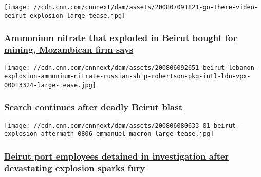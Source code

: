 \href{/2020/08/07/middleeast/beirut-lebanon-ammonium-nitrate-explosion/index.html}{}

\texttt{[image: //cdn.cnn.com/cnnnext/dam/assets/200807091821-go-there-video-beirut-explosion-large-tease.jpg]}

\hypertarget{ammonium-nitrate-that-exploded-in-beirut-bought-for-mining-mozambican-firm-says-}{%
\subsubsection{\texorpdfstring{\href{/2020/08/07/middleeast/beirut-lebanon-ammonium-nitrate-explosion/index.html}{Ammonium
nitrate that exploded in Beirut bought for mining, Mozambican firm says
}}{Ammonium nitrate that exploded in Beirut bought for mining, Mozambican firm says }}\label{ammonium-nitrate-that-exploded-in-beirut-bought-for-mining-mozambican-firm-says-}}

\href{/middleeast/live-news/beirut-lebanon-explosion-08-06-2020/index.html}{}

\texttt{[image: //cdn.cnn.com/cnnnext/dam/assets/200806092651-beirut-lebanon-explosion-ammonium-nitrate-russian-ship-robertson-pkg-intl-ldn-vpx-00013324-large-tease.jpg]}

\hypertarget{search-continues-after-deadly-beirut-blast}{%
\subsubsection{\texorpdfstring{\href{/middleeast/live-news/beirut-lebanon-explosion-08-06-2020/index.html}{Search
continues after deadly Beirut
blast}}{Search continues after deadly Beirut blast}}\label{search-continues-after-deadly-beirut-blast}}

\href{/2020/08/06/middleeast/beirut-explosion-anger-intl-hnk/index.html}{}

\texttt{[image: //cdn.cnn.com/cnnnext/dam/assets/200806080633-01-beirut-explosion-aftermath-0806-emmanuel-macron-large-tease.jpg]}

\hypertarget{beirut-port-employees-detained-in-investigation-after-devastating-explosion-sparks-fury}{%
\subsubsection{\texorpdfstring{\href{/2020/08/06/middleeast/beirut-explosion-anger-intl-hnk/index.html}{Beirut
port employees detained in investigation after devastating explosion
sparks
fury}}{Beirut port employees detained in investigation after devastating explosion sparks fury}}\label{beirut-port-employees-detained-in-investigation-after-devastating-explosion-sparks-fury}}

